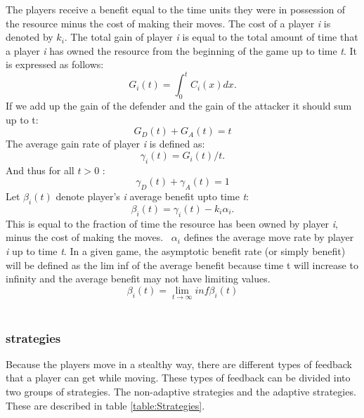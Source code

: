 The players receive a benefit equal to the time units they were in possession of the resource minus the cost of making their moves. The cost of a player \textit{i} is denoted by $k_{i}$. 
The total gain of player \textit{i} is equal to the total amount of time that a player \textit{i} has owned the resource from the beginning of the game up to time \textit{t}. It is expressed as follows:
\begin{equation}\label{first}
G_{i}(t) = \int_0^t \! C_{i}(x) dx.
\end{equation}
If we add up the gain of the defender and the gain of the attacker it should sum up to t:
\begin{equation}\label{first}
G_{D}(t) + G_{A}(t) = t
\end{equation}
The average gain rate of player \textit{i} is defined as:
\begin{equation}\label{first}
\gamma_{i}(t) = G_{i}(t)/t.
\end{equation}
And thus for all $t > 0$ :
\begin{equation}\label{first}
\gamma_{D}(t) + \gamma_{A}(t) = 1
\end{equation}
Let $\beta_{i}(t)$ denote player's \textit{i} average benefit upto time \textit{t}:
\begin{equation}\label{first}
\beta_{i}(t) = \gamma_{i}(t) - k_{i}\alpha_{i}.
\end{equation}
This is equal to the fraction of time the resource has been owned by player \textit{i}, minus the cost of making the moves. ~$ \alpha_{i}$ defines the average move rate by player \textit{i} up to time \textit{t}.
In a given game, the asymptotic benefit rate (or simply benefit) will be defined as the lim inf of the average benefit because time t will increase to infinity and the average benefit may not have limiting values.
\begin{equation}
\beta_{i}(t)  = \lim_{t \to \infty} inf \beta_{i}(t) 
\end{equation}
\\


\subsubsection{strategies}
Because the players move in a stealthy way, there are different types of feedback that a player can get while moving. These types of feedback can be divided into two groups of strategies. The non-adaptive strategies and the adaptive strategies. These are described in table \ref{table:Strategies}. \\

